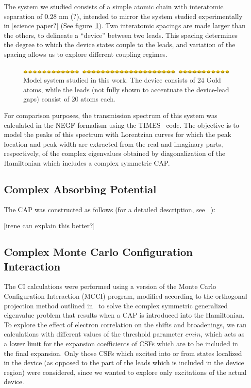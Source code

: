 The system we studied consists of a simple atomic chain with interatomic
separation of 0.28 nm (?), intended to mirror the system studied experimentally
in [science paper?] (See figure~\ref{fig:chaincapdevice}). Two interatomic
spacings are made larger than the others, to delineate a ``device'' between two
leads. This spacing determines the degree to which the device states couple to
the leads, and variation of the spacing allows us to explore different coupling
regimes.

\begin{figure}
	\begin{center}
		\includegraphics[width=0.9\linewidth]{figures/chaincapdevice}
	\end{center}
	\caption{Model system studied in this work. The device consists of 24
	Gold atoms, while the leads (not fully shown to accentuate the
	device-lead gaps) consist of 20 atoms each.}
	\label{fig:chaincapdevice}
\end{figure}

For comparison purposes, the transmission spectrum of this system was
calculated in the NEGF formalism using the TIMES~\cite{times} code. The
objective is to model the peaks of this spectrum with Lorentzian curves for
which the peak location and peak width are extracted from the real and
imaginary parts, respectively, of the complex eigenvalues obtained by
diagonalization of the Hamiltonian which includes a complex symmetric CAP.

\subsection{Complex Absorbing Potential}
\label{subsec:CAP}

The CAP was constructed as follows (for a detailed description, see~
\cite{henderson}):

[irene can explain this better?]

\subsection{Complex Monte Carlo Configuration Interaction}

The CI calculations were performed using a version of the Monte Carlo
Configuration Interaction (MCCI) program, modified according to the orthogonal
projection method outlined in~\cite{tarantelli_csd} to solve the complex
symmetric generalized eigenvalue problem that results when a CAP is introduced
into the Hamiltonian. To explore the effect of electron correlation on the
shifts and broadenings, we ran calculations with different values of the
threshold parameter $cmin$, which acts as a lower limit for the expansion
coefficients of CSFs which are to be included in the final expansion. Only
those CSFs which excited into or from states localized in the device (as
opposed to the part of the leads which is included in the device region) were
considered, since we wanted to explore only excitations of the actual device.

